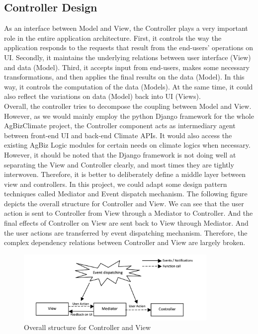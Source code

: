 \documentclass[onecolumn, draftclsnofoot,10pt, compsoc]{article}
\begin{document}
	\subsection{Controller Design}
	As an interface between Model and View, the Controller plays a very important role in the entire application architecture. First, it controls the way the application responds to the requests that result from the end-users' operations on UI. Secondly, it maintains the underlying relations between user interface (View) and data (Model). Third, it accepts input from end-users, makes some necessary transformations, and then applies the final results on the data (Model). In this way, it controls the computation of the data (Models). At the same time, it could also reflect the variations on data (Model) back into UI (Views). \\
	Overall, the controller tries to decompose the coupling between Model and View. However, as we would mainly employ the python Django framework for the whole AgBizClimate project, the Controller component acts as intermediary agent between front-end UI and back-end Climate APIs. It would also access the existing AgBiz Logic modules for certain needs on climate logics when necessary. However, it should be noted that the Django framework is not doing well at separating the View and Controller clearly, and most times they are tightly interwoven. Therefore, it is better to deliberately define a middle layer between view and controllers. In this project, we could adapt some design pattern techniques called Mediator and Event dispatch mechanism. The following figure depicts the overall structure for Controller and View. We can see that the user action is sent to Controller from View through a Mediator to Controller. And the final effects of Controller on View are sent back to View through Mediator. And the user actions are transferred by event dispatching mechanism. Therefore, the complex dependency relations between Controller and View are largely broken.\\
	\begin{figure}[htb]
		\begin{center}
			\includegraphics[width=275pt]{UMLDiagrams/Controller.jpeg}
		\end{center}
		\caption{Overall structure for Controller and View}
		\label{fig:UD1}
	\end{figure}
\end{document}
